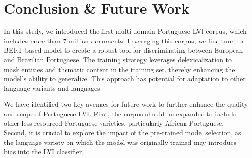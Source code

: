 \section{Conclusion \& Future Work}
\label{sec:conclusions}

In this study, we introduced the first multi-domain Portuguese LVI corpus, which includes more than 7 million documents. Leveraging this corpus, we fine-tuned a BERT-based model to create a robust tool for discriminating between European and Brazilian Portuguese. The training strategy leverages delexicalization to mask entities and thematic content in the training set, thereby enhancing the model's ability to generalize. This approach has potential for adaptation to other language variants and languages.

We have identified two key avenues for future work to further enhance the quality and scope of Portuguese LVI. First, the corpus should be expanded to include other less-resourced Portuguese varieties, particularly African Portuguese. Second, it is crucial to explore the impact of the pre-trained model selection, as the language variety on which the model was originally trained may introduce bias into the LVI classifier.

